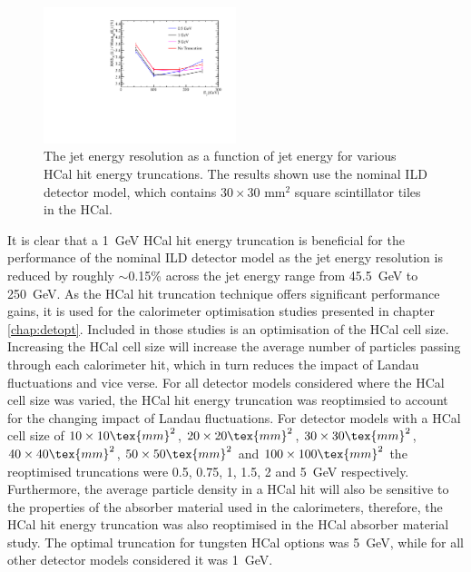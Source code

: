 \begin{figure}[h!]
\includegraphics[width=0.5\textwidth]{EnergyEstimators/Plots/CellTruncation/JER_vs_JetEnergy_HCalCellTruncation.pdf}
\caption[The jet energy resolution as a function of jet energy for various HCal hit energy truncations.  The results shown use the nominal ILD detector model, which contains $30\times30 \text{ mm}^{2}$ square scintillator tiles in the HCal.]{The jet energy resolution as a function of jet energy for various HCal hit energy truncations.  The results shown use the nominal ILD detector model, which contains $30\times30 \text{ mm}^{2}$ square scintillator tiles in the HCal.}
\label{fig:jercelltrunc}
\end{figure}

It is clear that a 1~GeV HCal hit energy truncation is beneficial for the performance of the nominal ILD detector model as the jet energy resolution is reduced by roughly $\sim$0.15\% across the jet energy range from 45.5~GeV to 250~GeV.  As the HCal hit truncation technique offers significant performance gains, it is used for the calorimeter optimisation studies presented in chapter \ref{chap:detopt}.  Included in those studies is an optimisation of the HCal cell size.  Increasing the HCal cell size will increase the average number of particles passing through each calorimeter hit, which in turn reduces the impact of Landau fluctuations and vice verse.  For all detector models considered where the HCal cell size was varied, the HCal hit energy truncation was reoptimsied to account for the changing impact of Landau fluctuations.  For detector models with a HCal cell size of $10 \times 10\tex{ mm}^{2}$, $20 \times 20\tex{ mm}^{2}$, $30 \times 30\tex{ mm}^{2}$, $40 \times 40\tex{ mm}^{2}$, $50 \times 50\tex{ mm}^{2}$ and $100 \times 100\tex{ mm}^{2}$ the reoptimised truncations were 0.5, 0.75, 1, 1.5, 2 and 5~GeV respectively.  Furthermore, the average particle density in a HCal hit will also be sensitive to the properties of the absorber material used in the calorimeters, therefore, the HCal hit energy truncation was also reoptimised in the HCal absorber material study.  The optimal truncation for tungsten HCal options was 5~GeV, while for all other detector models considered it was 1~GeV.

